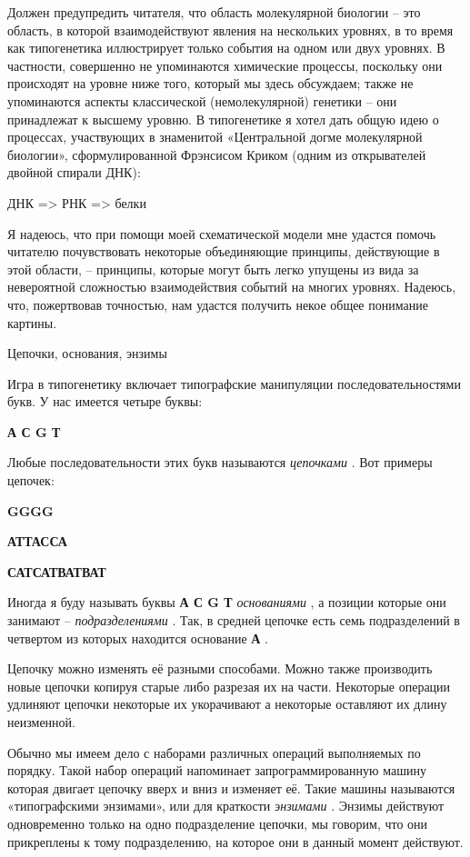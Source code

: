\documentclass[../main.tex]{subfiles}
\begin{document}
Должен предупредить читателя, что область молекулярной биологии \--- это область, в которой взаимодействуют явления на нескольких уровнях, в то время как типогенетика иллюстрирует только события на одном или двух уровнях. В частности, совершенно не упоминаются химические процессы, поскольку они происходят на уровне ниже того, который мы здесь обсуждаем; также не упоминаются аспекты классической (немолекулярной) генетики \--- они принадлежат к высшему уровню. В типогенетике я хотел дать общую идею о процессах, участвующих в знаменитой «Центральной догме молекулярной биологии», сформулированной Фрэнсисом Криком (одним из открывателей двойной спирали ДНК):

ДНК =\textgreater{} РНК =\textgreater{} белки

Я надеюсь, что при помощи моей схематической модели мне удастся помочь читателю почувствовать некоторые объединяющие принципы, действующие в этой области, \--- принципы, которые могут быть легко упущены из вида за невероятной сложностью взаимодействия событий на многих уровнях. Надеюсь, что, пожертвовав точностью, нам удастся получить некое общее понимание картины.

Цепочки, основания, энзимы

Игра в типогенетику включает типографские манипуляции последовательностями букв. У нас имеется четыре буквы:

\textbf{А С G Т}

Любые последовательности этих букв называются \emph{цепочками} . Вот примеры цепочек:

\textbf{GGGG}

\textbf{АТТАССА}

\textbf{САТСАТВАТВАТ}

Иногда я буду называть буквы \textbf{А С G Т} \emph{основаниями} , а позиции которые они занимают \--- \emph{подразделениями} . Так, в средней цепочке есть семь подразделений в четвертом из которых находится основание \textbf{А} .

Цепочку можно изменять её разными способами. Можно также производить новые цепочки копируя старые либо разрезая их на части. Некоторые операции удлиняют цепочки некоторые их укорачивают а некоторые оставляют их длину неизменной.

Обычно мы имеем дело с наборами различных операций выполняемых по порядку. Такой набор операций напоминает запрограммированную машину которая двигает цепочку вверх и вниз и изменяет её. Такие машины называются «типографскими энзимами», или для краткости \emph{энзимами} . Энзимы действуют одновременно только на одно подразделение цепочки, мы говорим, что они прикреплены к тому подразделению, на которое они в данный момент действуют.
\end{document}

